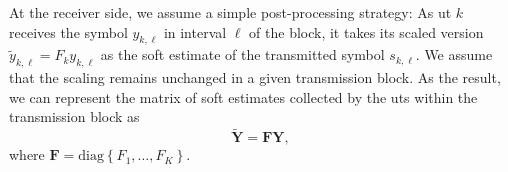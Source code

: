 \documentclass[12pt,draftclsnofoot,onecolumn,journal]{IEEEtran}
\newcommand{\cmt}[1]{\textcolor{red}{#1} }
\begin{document}
At the receiver side, we assume a simple post-processing strategy: As \ac{ut} $k$ receives the symbol $y_{k,\ell}$ in interval $\ell$ of the block, it takes its scaled version $\tilde{y}_{k,\ell} = F_k y_{k,\ell}$ as the soft estimate of the transmitted symbol $s_{k,\ell}$. We assume that the scaling remains unchanged in a given transmission block. As the result, we can represent the matrix of soft estimates collected by the \acp{ut} within the transmission block as
\begin{equation}
	\tilde{\mathbf Y}=\mathbf F \mathbf Y, %
\end{equation}
where $\mathbf{F} = \mathrm{diag} \left\lbrace F_1, \ldots, F_K \right\rbrace$.  %




\end{document}
